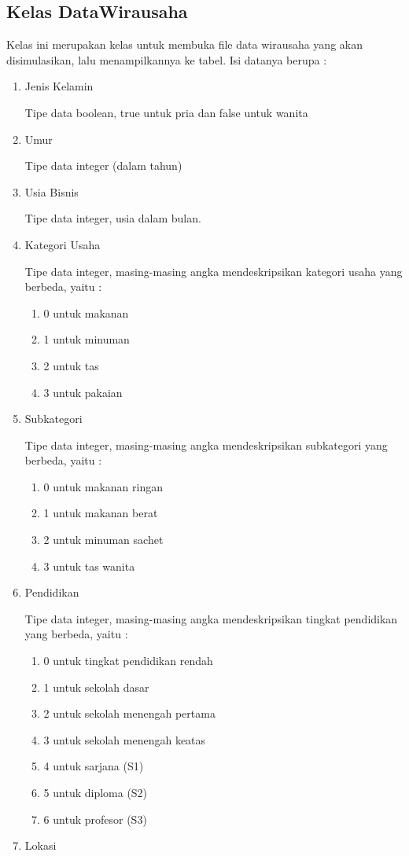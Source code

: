 \subsection{Kelas DataWirausaha}
Kelas ini merupakan kelas untuk membuka file data wirausaha yang akan disimulasikan, lalu menampilkannya ke tabel. Isi datanya berupa :
\begin{enumerate}
	\item Jenis Kelamin
	
	
	Tipe data boolean, true untuk pria dan false untuk wanita
	\item Umur
	
	
	Tipe data integer (dalam tahun)
	\item Usia Bisnis
	
	
	Tipe data integer, usia dalam bulan.
	\item Kategori Usaha
	
	
	Tipe data integer, masing-masing angka mendeskripsikan kategori usaha yang berbeda, yaitu :
		\begin{enumerate}
		\item 0 untuk makanan
		\item 1 untuk minuman 
		\item 2 untuk tas
		\item 3 untuk pakaian
		\end{enumerate}
	\item Subkategori
	
	
	Tipe data integer, masing-masing angka mendeskripsikan subkategori yang berbeda, yaitu :
	\begin{enumerate}
		\item 0 untuk makanan ringan
		\item 1 untuk makanan berat
		\item 2 untuk minuman sachet
		\item 3 untuk tas wanita
	\end{enumerate}
		
		\item Pendidikan
		
		
		Tipe data integer, masing-masing angka mendeskripsikan tingkat pendidikan yang berbeda, yaitu :
		\begin{enumerate}
			\item 0 untuk tingkat pendidikan rendah
			\item 1 untuk sekolah dasar
			\item 2 untuk sekolah menengah pertama
			\item 3 untuk sekolah menengah keatas
			\item 4 untuk sarjana (S1)
			\item 5 untuk diploma (S2)
			\item 6 untuk profesor (S3)
		\end{enumerate}
		\item Lokasi
		

\end{enumerate}
